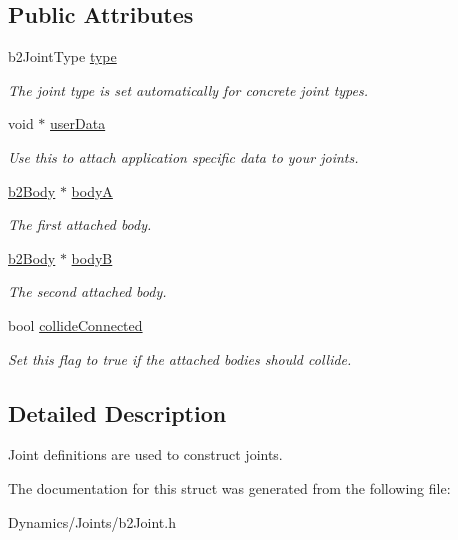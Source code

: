 \subsection*{Public Attributes}
\begin{DoxyCompactItemize}
\item 
\mbox{\label{structb2JointDef_a470f2879b24adb05facbd49f338856fb}} 
b2\+Joint\+Type \mbox{\hyperlink{structb2JointDef_a470f2879b24adb05facbd49f338856fb}{type}}
\begin{DoxyCompactList}\small\item\em The joint type is set automatically for concrete joint types. \end{DoxyCompactList}\item 
\mbox{\label{structb2JointDef_a07eb150daaaa52fc09c3bcf402b295fe}} 
void $\ast$ \mbox{\hyperlink{structb2JointDef_a07eb150daaaa52fc09c3bcf402b295fe}{user\+Data}}
\begin{DoxyCompactList}\small\item\em Use this to attach application specific data to your joints. \end{DoxyCompactList}\item 
\mbox{\label{structb2JointDef_a8cd54c93da396be75a9788f2c6897f05}} 
\mbox{\hyperlink{classb2Body}{b2\+Body}} $\ast$ \mbox{\hyperlink{structb2JointDef_a8cd54c93da396be75a9788f2c6897f05}{bodyA}}
\begin{DoxyCompactList}\small\item\em The first attached body. \end{DoxyCompactList}\item 
\mbox{\label{structb2JointDef_aa4f4dee2fbcd12187b19506b60e68e3d}} 
\mbox{\hyperlink{classb2Body}{b2\+Body}} $\ast$ \mbox{\hyperlink{structb2JointDef_aa4f4dee2fbcd12187b19506b60e68e3d}{bodyB}}
\begin{DoxyCompactList}\small\item\em The second attached body. \end{DoxyCompactList}\item 
\mbox{\label{structb2JointDef_aef099a1f89b64e230173b6016848ea9b}} 
bool \mbox{\hyperlink{structb2JointDef_aef099a1f89b64e230173b6016848ea9b}{collide\+Connected}}
\begin{DoxyCompactList}\small\item\em Set this flag to true if the attached bodies should collide. \end{DoxyCompactList}\end{DoxyCompactItemize}


\subsection{Detailed Description}
Joint definitions are used to construct joints. 

The documentation for this struct was generated from the following file\+:\begin{DoxyCompactItemize}
\item 
Dynamics/\+Joints/b2\+Joint.\+h\end{DoxyCompactItemize}
